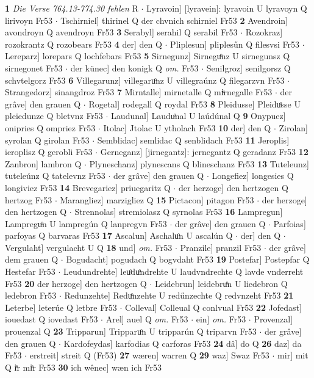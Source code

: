 \documentclass[8pt,a4paper,notitlepage]{article}
\begin{document}
\begin{table}[ht]
\begin{minipage}[t]{0.5\linewidth}
\textbf{1} \textit{Die Verse 764.13-774.30 fehlen} R   $\cdot$ Lyravoin] [lyravein]: lyravoin U lyravoyn Q lirivoyn Fr53  $\cdot$ Tschirniel] thirinel Q der chvnich schirniel Fr53 \textbf{2} Avendroin] avondroyn Q avendroyn Fr53 \textbf{3} Serabyl] serahil Q serabil Fr53  $\cdot$ Rozokraz] rozokrantz Q rozobears Fr53 \textbf{4} der] den Q  $\cdot$ Pliplesun] pliplesűn Q filesvsi Fr53  $\cdot$ Lereparz] lorepars Q lochfebars Fr53 \textbf{5} Sirnegunz] Sirneguͦnz U sirnegunsz Q sirnegonet Fr53  $\cdot$ der künec] den konigk Q \textit{om.} Fr53  $\cdot$ Senilgroz] senilgorsz Q schvtelgorz Fr53 \textbf{6} Villegarunz] villegaruͦnz U villegraúnz Q filegarzvn Fr53  $\cdot$ Strangedorz] sinangdroz Fr53 \textbf{7} Mirntalle] mirnetalle Q miͤrnegalle Fr53  $\cdot$ der grâve] den grauen Q  $\cdot$ Rogetal] rodegall Q roydal Fr53 \textbf{8} Pleidusse] Pleiduͦsse U pleiedunze Q bletvnz Fr53  $\cdot$ Laudunal] Lauduͦnal U laúdúnal Q \textbf{9} Onypuez] onipries Q ompriez Fr53  $\cdot$ Itolac] Jtolac U ytholach Fr53 \textbf{10} der] den Q  $\cdot$ Zirolan] syrolan Q girolan Fr53  $\cdot$ Semblidac] semlidac Q senblidach Fr53 \textbf{11} Jeroplis] ieroplisz Q gerobli Fr53  $\cdot$ Gerneganz] [jirnegantz]: jernegantz Q geradanz Fr53 \textbf{12} Zanbron] lambron Q  $\cdot$ Plyneschanz] plynescans Q blineschanz Fr53 \textbf{13} Tuteleunz] tuteleúnz Q tatelevnz Fr53  $\cdot$ der grâve] den grauen Q  $\cdot$ Longefiez] longesies Q longiviez Fr53 \textbf{14} Brevegariez] priuegaritz Q  $\cdot$ der herzoge] den hertzogen Q hertzog Fr53  $\cdot$ Marangliez] marzigliez Q \textbf{15} Pictacon] pitagon Fr53  $\cdot$ der herzoge] den hertzogen Q  $\cdot$ Strennolas] stremiolasz Q syrnolas Fr53 \textbf{16} Lampregun] Lampreguͦn U lampregún Q lanpregvn Fr53  $\cdot$ der grâve] den grauen Q  $\cdot$ Parfoias] parfoyas Q barvaras Fr53 \textbf{17} Ascalun] Aschaluͦn U ascalún Q  $\cdot$ der] den Q  $\cdot$ Vergulaht] vergulacht U Q \textbf{18} und] \textit{om.} Fr53  $\cdot$ Pranzile] pranzil Fr53  $\cdot$ der grâve] dem grauen Q  $\cdot$ Bogudacht] pogudach Q bogvdaht Fr53 \textbf{19} Postefar] Postepfar Q Hestefar Fr53  $\cdot$ Leudundrehte] leuͦduͦndrehte U laudvndrechte Q lavde vnderreht Fr53 \textbf{20} der herzoge] den hertzogen Q  $\cdot$ Leidebrun] leidebruͦn U liedebron Q ledebron Fr53  $\cdot$ Redunzehte] Reduͦnzehte U redűnzechte Q redvnzeht Fr53 \textbf{21} Leterbe] leterúe Q letbre Fr53  $\cdot$ Colleval] Colleual Q conlvual Fr53 \textbf{22} Jofedast] iouedast Q iovedast Fr53  $\cdot$ Arel] auel Q \textit{om.} Fr53  $\cdot$ ein] \textit{om.} Fr53  $\cdot$ Provenzal] prouenzal Q \textbf{23} Tripparun] Tripparuͦn U tripparún Q triparvn Fr53  $\cdot$ der grâve] den grauen Q  $\cdot$ Kardofeydas] karfodias Q carforas Fr53 \textbf{24} dâ] do Q \textbf{26} daz] da Fr53  $\cdot$ erstreit] streit Q (Fr53) \textbf{27} wæren] warren Q \textbf{29} waz] Swaz Fr53  $\cdot$ mir] mit Q iͤr miͤr Fr53 \textbf{30} ich wênec] wæn ich Fr53 \newline
\end{minipage}
\end{table}
\end{document}
